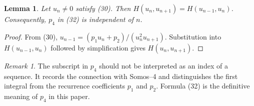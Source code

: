 \documentclass[11pt]{article}
\newtheorem{lemma}[theorem]{Lemma}
\theoremstyle{remark}
\newtheorem{remark}[theorem]{Remark}
\begin{document}
\begin{lemma}
Let $u_n\ne0$ satisfy (30). Then $H(u_n,u_{n+1})=H(u_{n-1},u_n)$. Consequently, $p_4$ in (32) is independent of $n$.
\end{lemma}
\begin{proof}
From (30), $u_{n-1}=(p_1u_n+p_2)/(u_n^2u_{n+1})$. Substitution into $H(u_{n-1},u_n)$ followed by simplification gives $H(u_n,u_{n+1})$.
\end{proof}
\begin{remark}
The subscript in $p_4$ should not be interpreted as an index of a sequence. It records the connection with Somos--4 and distinguishes the first integral from the recurrence coefficients $p_1$ and $p_2$. Formula (32) is the definitive meaning of $p_4$ in this paper.
\end{remark}
\end{document}

